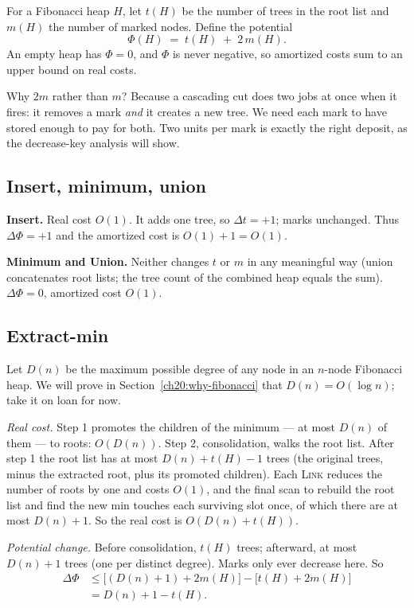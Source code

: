 \begin{formalbox}
For a Fibonacci heap $H$, let $t(H)$ be the number of trees in the root list and
$m(H)$ the number of marked nodes. Define the potential
\[
  \Phi(H) \;=\; t(H) \;+\; 2\,m(H).
\]
An empty heap has $\Phi = 0$, and $\Phi$ is never negative, so amortized costs sum
to an upper bound on real costs.
\end{formalbox}

Why $2m$ rather than $m$? Because a cascading cut does two jobs at once when it
fires: it removes a mark \emph{and} it creates a new tree. We need each mark to
have stored enough to pay for both. Two units per mark is exactly the right
deposit, as the decrease-key analysis will show.

\subsection{Insert, minimum, union}

\textbf{Insert.} Real cost $O(1)$. It adds one tree, so $\Delta t = +1$; marks
unchanged. Thus $\Delta\Phi = +1$ and the amortized cost is $O(1) + 1 = O(1)$.

\textbf{Minimum and Union.} Neither changes $t$ or $m$ in any meaningful way
(union concatenates root lists; the tree count of the combined heap equals the
sum). $\Delta\Phi = 0$, amortized cost $O(1)$.

\subsection{Extract-min}

Let $D(n)$ be the maximum possible degree of any node in an $n$-node Fibonacci
heap. We will prove in Section~\ref{ch20:why-fibonacci} that $D(n) = O(\log n)$;
take it on loan for now.

\emph{Real cost.} Step 1 promotes the children of the minimum --- at most $D(n)$ of
them --- to roots: $O(D(n))$. Step 2, consolidation, walks the root list. After
step 1 the root list has at most $D(n) + t(H) - 1$ trees (the original trees, minus
the extracted root, plus its promoted children). Each \textsc{Link} reduces the
number of roots by one and costs $O(1)$, and the final scan to rebuild the root
list and find the new min touches each surviving slot once, of which there are at
most $D(n)+1$. So the real cost is $O(D(n) + t(H))$.

\emph{Potential change.} Before consolidation, $t(H)$ trees; afterward, at most
$D(n)+1$ trees (one per distinct degree). Marks only ever decrease here. So
\begin{align*}
  \Delta\Phi &\le \big[(D(n)+1) + 2m(H)\big] - \big[t(H) + 2m(H)\big] \\
             &= D(n) + 1 - t(H).
\end{align*}

